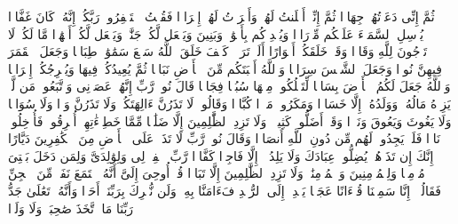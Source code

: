 \stopbuffer
\startbuffer[\q:71:8]
ثُمَّ إِنِّی دَعَوۡتُهُمۡ جِهَارࣰا%
\stopbuffer
\startbuffer[\q:71:9]
ثُمَّ إِنِّیۤ أَعۡلَنتُ لَهُمۡ وَأَسۡرَرۡتُ لَهُمۡ إِسۡرَارࣰا%
\stopbuffer
\startbuffer[\q:71:10]
فَقُلۡتُ ٱسۡتَغۡفِرُوا۟ رَبَّكُمۡ إِنَّهُۥ كَانَ غَفَّارࣰا%
\stopbuffer
\startbuffer[\q:71:11]
یُرۡسِلِ ٱلسَّمَاۤءَ عَلَیۡكُم مِّدۡرَارࣰا%
\stopbuffer
\startbuffer[\q:71:12]
وَیُمۡدِدۡكُم بِأَمۡوَٰلࣲ وَبَنِینَ وَیَجۡعَل لَّكُمۡ جَنَّٰتࣲ وَیَجۡعَل لَّكُمۡ أَنۡهَٰرࣰا%
\stopbuffer
\startbuffer[\q:71:13]
مَّا لَكُمۡ لَا تَرۡجُونَ لِلَّهِ وَقَارࣰا%
\stopbuffer
\startbuffer[\q:71:14]
وَقَدۡ خَلَقَكُمۡ أَطۡوَارًا%
\stopbuffer
\startbuffer[\q:71:15]
أَلَمۡ تَرَوۡا۟ كَیۡفَ خَلَقَ ٱللَّهُ سَبۡعَ سَمَٰوَٰتࣲ طِبَاقࣰا%
\stopbuffer
\startbuffer[\q:71:16]
وَجَعَلَ ٱلۡقَمَرَ فِیهِنَّ نُورࣰا وَجَعَلَ ٱلشَّمۡسَ سِرَاجࣰا%
\stopbuffer
\startbuffer[\q:71:17]
وَٱللَّهُ أَنۢبَتَكُم مِّنَ ٱلۡأَرۡضِ نَبَاتࣰا%
\stopbuffer
\startbuffer[\q:71:18]
ثُمَّ یُعِیدُكُمۡ فِیهَا وَیُخۡرِجُكُمۡ إِخۡرَاجࣰا%
\stopbuffer
\startbuffer[\q:71:19]
وَٱللَّهُ جَعَلَ لَكُمُ ٱلۡأَرۡضَ بِسَاطࣰا%
\stopbuffer
\startbuffer[\q:71:20]
لِّتَسۡلُكُوا۟ مِنۡهَا سُبُلࣰا فِجَاجࣰا%
\stopbuffer
\startbuffer[\q:71:21]
قَالَ نُوحࣱ رَّبِّ إِنَّهُمۡ عَصَوۡنِی وَٱتَّبَعُوا۟ مَن لَّمۡ یَزِدۡهُ مَالُهُۥ وَوَلَدُهُۥۤ إِلَّا خَسَارࣰا%
\stopbuffer
\startbuffer[\q:71:22]
وَمَكَرُوا۟ مَكۡرࣰا كُبَّارࣰا%
\stopbuffer
\startbuffer[\q:71:23]
وَقَالُوا۟ لَا تَذَرُنَّ ءَالِهَتَكُمۡ وَلَا تَذَرُنَّ وَدࣰّا وَلَا سُوَاعࣰا وَلَا یَغُوثَ وَیَعُوقَ وَنَسۡرࣰا%
\stopbuffer
\startbuffer[\q:71:24]
وَقَدۡ أَضَلُّوا۟ كَثِیرࣰاۖ وَلَا تَزِدِ ٱلظَّٰلِمِینَ إِلَّا ضَلَٰلࣰا%
\stopbuffer
\startbuffer[\q:71:25]
مِّمَّا خَطِیۤءَٰتِهِمۡ أُغۡرِقُوا۟ فَأُدۡخِلُوا۟ نَارࣰا فَلَمۡ یَجِدُوا۟ لَهُم مِّن دُونِ ٱللَّهِ أَنصَارࣰا%
\stopbuffer
\startbuffer[\q:71:26]
وَقَالَ نُوحࣱ رَّبِّ لَا تَذَرۡ عَلَى ٱلۡأَرۡضِ مِنَ ٱلۡكَٰفِرِینَ دَیَّارًا%
\stopbuffer
\startbuffer[\q:71:27]
إِنَّكَ إِن تَذَرۡهُمۡ یُضِلُّوا۟ عِبَادَكَ وَلَا یَلِدُوۤا۟ إِلَّا فَاجِرࣰا كَفَّارࣰا%
\stopbuffer
\startbuffer[\q:71:28]
رَّبِّ ٱغۡفِرۡ لِی وَلِوَٰلِدَیَّ وَلِمَن دَخَلَ بَیۡتِیَ مُؤۡمِنࣰا وَلِلۡمُؤۡمِنِینَ وَٱلۡمُؤۡمِنَٰتِۖ وَلَا تَزِدِ ٱلظَّٰلِمِینَ إِلَّا تَبَارَۢا%
\stopbuffer
\startbuffer[\q:72:1]
قُلۡ أُوحِیَ إِلَیَّ أَنَّهُ ٱسۡتَمَعَ نَفَرࣱ مِّنَ ٱلۡجِنِّ فَقَالُوۤا۟ إِنَّا سَمِعۡنَا قُرۡءَانًا عَجَبࣰا%
\stopbuffer
\startbuffer[\q:72:2]
یَهۡدِیۤ إِلَى ٱلرُّشۡدِ فَءَامَنَّا بِهِۦۖ وَلَن نُّشۡرِكَ بِرَبِّنَاۤ أَحَدࣰا%
\stopbuffer
\startbuffer[\q:72:3]
وَأَنَّهُۥ تَعَٰلَىٰ جَدُّ رَبِّنَا مَا ٱتَّخَذَ صَٰحِبَةࣰ وَلَا وَلَدࣰا%
\stopbuffer
